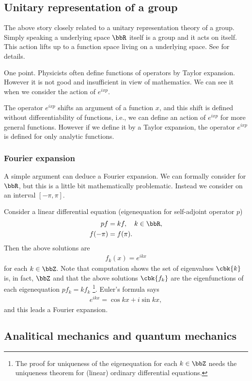 \documentclass[openany, a4paper, oneside]{jsbook}
\begin{document}
\subsection{Unitary representation of a group}

The above story closely related to a unitary representation theory of a group.
Simply speaking a underlying space $\bbR$ itself is a group
and it acts on itself.
This action lifts up to a function space living on a underlying space.
See \cite{KobayashiOshima1} for details.

One point.
Physicists often define functions of operators by Taylor expansion.
However it is not good and insufficient in view of mathematics.
We can see it when we consider the action of $e^{ixp}$.

The operator $e^{i x p}$ shifts an argument of a function $x$,
and this shift is defined without differentiability of functions,
i.e., we can define an action of $e^{ixp}$ for more general functions.
However if we define it by a Taylor expansion,
the operator $e^{ixp}$ is defined for only analytic functions.
\subsubsection{Fourier expansion}

A simple argument can deduce a Fourier expansion.
We can formally consider for $\bbR$,
but this is a little bit mathematically problematic.
Instead we consider on an interval $[ - \pi, \pi]$.

Consider a linear differential equation (eigenequation for
self-adjoint operator $p$)
\begin{align}
 p f
 &=
 k f, \quad k \in \bbR, \\
 f(-\pi)
 &=
 f(\pi).
\end{align}
Then the above solutions are
\begin{align}
 f_k(x)
 =
 e^{ikx}
\end{align}
for each $k \in \bbZ$.
Note that computation shows the set of eigenvalues $\cbk{k}$ is, in fact, $\bbZ$ and that
the above solutions $\cbk{f_k}$ are the eigenfunctions of each eigenequation $p f_k = k f_k$ \footnote{The proof for uniqueness of the eigenequation for each $k \in \bbZ$ needs the
uniqueness theorem for (linear) ordinary differential equations.}.
Euler's formula says
\begin{align}
 e^{ikx}
 =
 \cos kx + i \sin kx,
\end{align}
and this leads a Fourier expansion.
\subsection{Analitical mechanics and quantum mechanics}
\end{document}
